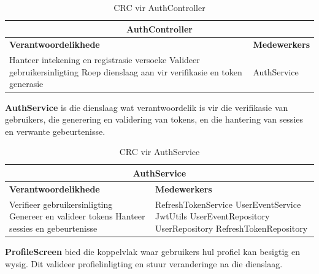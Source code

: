 \begin{table}[H]
\centering
\begin{tabular}{|p{}|p{}|}
    \hline
    \multicolumn{2}{|c|}{\textbf{AuthController}} \\
    \hline
    \textbf{Verantwoordelikhede} & \textbf{Medewerkers} \\
    \hline
    Hanteer intekening en registrasie versoeke \newline
    Valideer gebruikersinligting \newline
    Roep dienslaag aan vir verifikasie en token generasie
    &
    AuthService \\
    \hline
\end{tabular}
\caption{CRC vir AuthController}
\label{tab:crc_auth_controller}
\end{table}
\vspace{1em}

\textbf{AuthService} is die dienslaag wat verantwoordelik is vir die verifikasie van gebruikers, die generering en validering van tokens, en die hantering van sessies en verwante gebeurtenisse.

\begin{table}[H]
\centering
\begin{tabular}{|p{}|p{}|}
    \hline
    \multicolumn{2}{|c|}{\textbf{AuthService}} \\
    \hline
    \textbf{Verantwoordelikhede} & \textbf{Medewerkers} \\
    \hline
    Verifieer gebruikersinligting \newline
    Genereer en valideer tokens \newline
    Hanteer sessies en gebeurtenisse
    &
    RefreshTokenService \newline
    UserEventService \newline
    JwtUtils \newline
    UserEventRepository \newline
    UserRepository  \newline
    RefreshTokenRepository  \\
    \hline
\end{tabular}
\caption{CRC vir AuthService}
\label{tab:crc_auth_service}
\end{table}
\vspace{1em}

\textbf{ProfileScreen} bied die koppelvlak waar gebruikers hul profiel kan besigtig en wysig. Dit valideer profielinligting en stuur veranderinge na die dienslaag.

